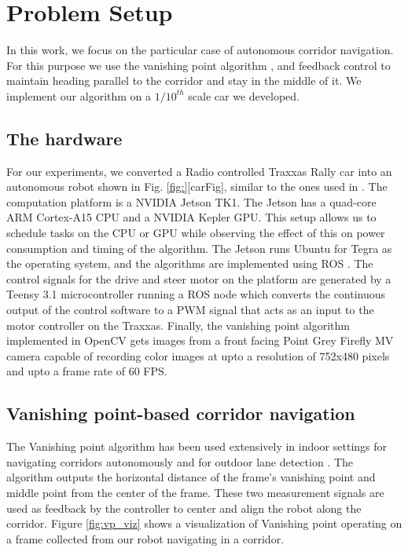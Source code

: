 \section{Problem Setup}

In this work, we focus on the particular case of autonomous corridor navigation. For this purpose we use the vanishing point algorithm \cite{VP1}, \cite{VP2} and feedback control to maintain heading parallel to the corridor and stay in the middle of it. We implement our algorithm on a $1/10^{th}$ scale car we developed. 

\subsection{The hardware}

For our experiments, we converted a Radio controlled Traxxas Rally car into an autonomous robot shown in Fig. \ref{fig:}[carFig], similar to the ones used in \cite{racecar_mit}. The computation platform is a NVIDIA Jetson TK1. The Jetson has a quad-core ARM Cortex-A15 CPU and a NVIDIA Kepler GPU. 
This setup allows us to schedule tasks on the CPU or GPU while observing the effect of this on power consumption and timing of the algorithm. 
The Jetson runs Ubuntu for Tegra as the operating system, and the algorithms are implemented using ROS \cite{ros}. The control signals for the drive and steer motor on the platform are generated by a Teensy 3.1 microcontroller running a ROS node which converts the continuous output of the control software to a PWM signal that acts as an input to the motor controller on the Traxxas. Finally, the vanishing point algorithm implemented in OpenCV \cite{opencv} gets images from a front facing Point Grey Firefly MV camera capable of recording color images at upto a resolution of 752x480 pixels and upto a frame rate of 60 FPS. 

\subsection{Vanishing point-based corridor navigation}

The Vanishing point algorithm \cite{VP1} has been used extensively in indoor settings for navigating corridors autonomously \cite{VP2, VP3} and for outdoor lane detection \cite{gallagher2002ground}. 
The algorithm outputs the horizontal distance of the frame's vanishing point and middle point from the center of the frame. 
These two measurement signals are used as feedback by the controller to center and align the robot along the corridor. 
Figure \ref{fig:vp_viz} shows a visualization of Vanishing point operating on a frame collected from our robot navigating in a corridor.

